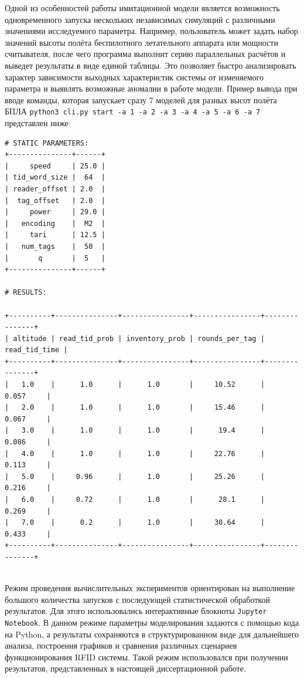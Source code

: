 \documentclass[12pt]{article}
\theoremstyle{definition}
\begin{document}
Одной из особенностей работы имитационной модели является возможность одновременного запуска нескольких независимых симуляций с различными значениями исследуемого параметра. Например, пользователь может задать набор значений высоты полёта беспилотного летательного аппарата или мощности считывателя, после чего программа выполнит серию параллельных расчётов и выведет результаты в виде единой таблицы. Это позволяет быстро анализировать характер зависимости выходных характеристик системы от изменяемого параметра и выявлять возможные аномалии в работе модели. Пример вывода при вводе команды, которая запускает сразу 7 моделей для разных высот полёта БПЛА \texttt{python3 cli.py start -a 1 -a 2 -a 3 -a 4 -a 5 -a 6 -a 7} представлен ниже:

\begin{verbatim}
# STATIC PARAMETERS:
+---------------+------+
|     speed     | 25.0 |
| tid_word_size |  64  |
| reader_offset | 2.0  |
|  tag_offset   | 2.0  |
|     power     | 29.0 |
|   encoding    |  M2  |
|     tari      | 12.5 |
|   num_tags    |  50  |
|       q       |  5   |
+---------------+------+

# RESULTS:

+----------+---------------+----------------+----------------+---------------+
| altitude | read_tid_prob | inventory_prob | rounds_per_tag | read_tid_time |
+----------+---------------+----------------+----------------+---------------+
|   1.0    |      1.0      |      1.0       |     10.52      |     0.057     |
|   2.0    |      1.0      |      1.0       |     15.46      |     0.067     |
|   3.0    |      1.0      |      1.0       |      19.4      |     0.086     |
|   4.0    |      1.0      |      1.0       |     22.76      |     0.113     |
|   5.0    |     0.96      |      1.0       |     25.26      |     0.216     |
|   6.0    |     0.72      |      1.0       |      28.1      |     0.269     |
|   7.0    |      0.2      |      1.0       |     30.64      |     0.433     |
+----------+---------------+----------------+----------------+---------------+


\end{verbatim}

Режим проведения вычислительных экспериментов ориентирован на выполнение большого количества запусков с последующей статистической обработкой результатов. Для этого использовались интерактивные блокноты \texttt{Jupyter Notebook}. В данном режиме параметры моделирования задаются с помощью кода на Python, а результаты сохраняются в структурированном виде для дальнейшего анализа, построения графиков и сравнения различных сценариев функционирования RFID системы. Такой режим использовался при получении результатов, представленных в настоящей диссертационной работе.
\end{document}
